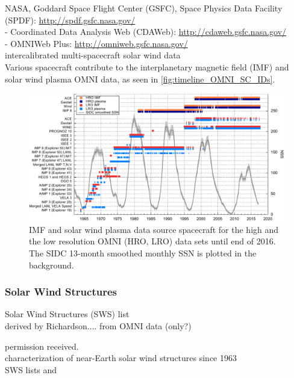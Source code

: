 NASA, Goddard Space Flight Center (GSFC), Space Physics Data Facility (SPDF): \url{http://spdf.gsfc.nasa.gov/}\\	%
- Coordinated Data Analysis Web (CDAWeb): \url{http://cdaweb.gsfc.nasa.gov/}\\	%
- OMNIWeb Plus: \url{http://omniweb.gsfc.nasa.gov/}\\	%

intercalibrated multi-spacecraft solar wind data\\
Various spacecraft contribute to the interplanetary magnetic field (IMF) and solar wind plasma OMNI data, as seen in \autoref{fig:timeline_OMNI_SC_IDs}.\\
\begin{figure}[htb]
	\centering
	\includegraphics[width=\textwidth]{images/gnuplots/timeline_OMNI_SC_IDs.pdf}
	\caption{IMF and solar wind plasma data source spacecraft for the high and the low resolution OMNI (HRO, LRO) data sets until end of 2016. The SIDC 13-month smoothed monthly SSN is plotted in the background.}
	\label{fig:timeline_OMNI_SC_IDs}
\end{figure}

\subsubsection{Solar Wind Structures}
Solar Wind Structures (SWS) list\\
derived by Richardson.... from OMNI data (only?)

permission received.\\

characterization of near-Earth solar wind structures since 1963\\
SWS lists \citep{Richardson2000} and \citep{Richardson2012}


